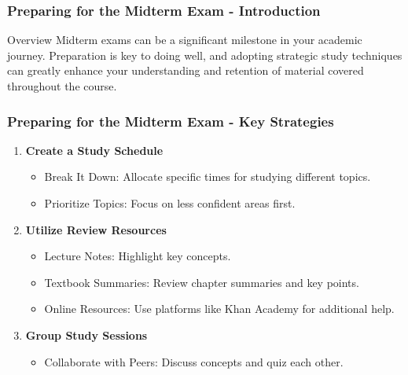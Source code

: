 \documentclass{beamer}
\begin{document}
\begin{frame}[fragile]
    \frametitle{Preparing for the Midterm Exam - Introduction}
    \begin{block}{Overview}
        Midterm exams can be a significant milestone in your academic journey. 
        Preparation is key to doing well, and adopting strategic study techniques can greatly enhance your understanding and retention of material covered throughout the course.
    \end{block}
\end{frame}

\begin{frame}[fragile]
    \frametitle{Preparing for the Midterm Exam - Key Strategies}
    \begin{enumerate}
        \item \textbf{Create a Study Schedule}
            \begin{itemize}
                \item Break It Down: Allocate specific times for studying different topics.
                \item Prioritize Topics: Focus on less confident areas first.
            \end{itemize}

        \item \textbf{Utilize Review Resources}
            \begin{itemize}
                \item Lecture Notes: Highlight key concepts.
                \item Textbook Summaries: Review chapter summaries and key points.
                \item Online Resources: Use platforms like Khan Academy for additional help.
            \end{itemize}

        \item \textbf{Group Study Sessions}
            \begin{itemize}
                \item Collaborate with Peers: Discuss concepts and quiz each other.
            \end{itemize}
    \end{enumerate}
\end{frame}
\end{document}
